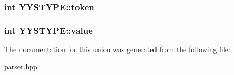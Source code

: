 \subsubsection[{token}]{\setlength{\rightskip}{0pt plus 5cm}int Y\+Y\+S\+T\+Y\+P\+E\+::token}\label{unionYYSTYPE_a01b79e2c4a8e5ec028cca4892559e802}
\hypertarget{unionYYSTYPE_acfe61c5751a9282c4ea0d9b345de371b}{}
\subsubsection[{value}]{\setlength{\rightskip}{0pt plus 5cm}int Y\+Y\+S\+T\+Y\+P\+E\+::value}\label{unionYYSTYPE_acfe61c5751a9282c4ea0d9b345de371b}


The documentation for this union was generated from the following file\+:\begin{DoxyCompactItemize}
\item 
\hyperlink{parser_8hpp}{parser.\+hpp}\end{DoxyCompactItemize}
